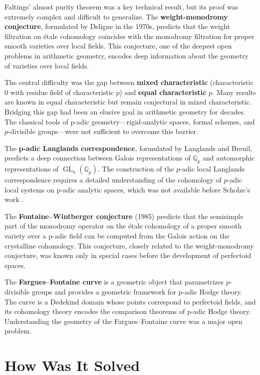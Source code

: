 Faltings' almost purity theorem was a key technical result, but its proof was extremely complex and difficult to generalize. The \textbf{weight-monodromy conjecture}, formulated by Deligne in the 1970s, predicts that the weight filtration on \'{e}tale cohomology coincides with the monodromy filtration for proper smooth varieties over local fields. This conjecture, one of the deepest open problems in arithmetic geometry, encodes deep information about the geometry of varieties over local fields.

The central difficulty was the gap between \textbf{mixed characteristic} (characteristic 0 with residue field of characteristic $p$) and \textbf{equal characteristic} $p$. Many results are known in equal characteristic but remain conjectural in mixed characteristic. Bridging this gap had been an elusive goal in arithmetic geometry for decades. The classical tools of p-adic geometry---rigid-analytic spaces, formal schemes, and $p$-divisible groups---were not sufficient to overcome this barrier.

The \textbf{p-adic Langlands correspondence}, formulated by Langlands and Breuil, predicts a deep connection between Galois representations of $\mathbb{Q}_p$ and automorphic representations of $\operatorname{GL}_n(\mathbb{Q}_p)$. The construction of the $p$-adic local Langlands correspondence requires a detailed understanding of the cohomology of $p$-adic local systems on p-adic analytic spaces, which was not available before Scholze's work \cite{scholze2012}.

The \textbf{Fontaine--Wintberger conjecture} (1985) predicts that the semisimple part of the monodromy operator on the \'{e}tale cohomology of a proper smooth variety over a p-adic field can be computed from the Galois action on the crystalline cohomology. This conjecture, closely related to the weight-monodromy conjecture, was known only in special cases before the development of perfectoid spaces.

The \textbf{Fargues--Fontaine curve} is a geometric object that parametrizes $p$-divisible groups and provides a geometric framework for p-adic Hodge theory. The curve is a Dedekind domain whose points correspond to perfectoid fields, and its cohomology theory encodes the comparison theorems of p-adic Hodge theory. Understanding the geometry of the Fargues--Fontaine curve was a major open problem.

\section{How Was It Solved}

